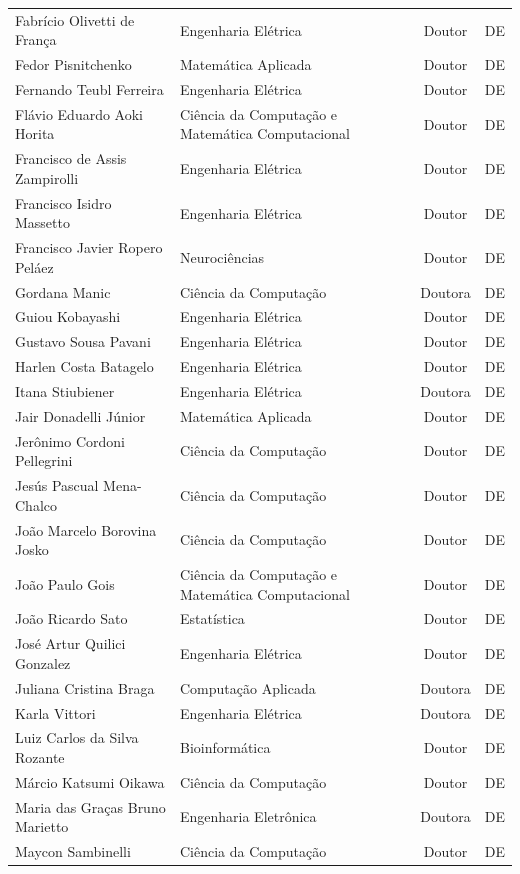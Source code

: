 \documentclass{article}
\begin{document}
\begin{longtable}{|l|l|c|c|}
Fabrício Olivetti de França & Engenharia Elétrica & Doutor & DE \\
Fedor Pisnitchenko & Matemática Aplicada & Doutor & DE \\
Fernando Teubl Ferreira & Engenharia Elétrica & Doutor & DE \\
Flávio Eduardo Aoki Horita & Ciência da Computação e Matemática Computacional & Doutor & DE \\
Francisco de Assis Zampirolli & Engenharia Elétrica & Doutor & DE \\
Francisco Isidro Massetto & Engenharia Elétrica & Doutor & DE \\
Francisco Javier Ropero Peláez & Neurociências & Doutor & DE \\
Gordana Manic & Ciência da Computação & Doutora & DE \\
Guiou Kobayashi & Engenharia Elétrica & Doutor & DE \\
Gustavo Sousa Pavani & Engenharia Elétrica & Doutor & DE \\
Harlen Costa Batagelo & Engenharia Elétrica & Doutor & DE \\
Itana Stiubiener & Engenharia Elétrica  & Doutora & DE \\
Jair Donadelli Júnior & Matemática Aplicada & Doutor & DE \\
Jerônimo Cordoni Pellegrini & Ciência da Computação & Doutor & DE \\
Jesús Pascual Mena-Chalco & Ciência da Computação & Doutor & DE \\
João Marcelo Borovina Josko & Ciência da Computação & Doutor & DE \\
João Paulo Gois & Ciência da Computação e Matemática Computacional & Doutor & DE \\
João Ricardo Sato & Estatística & Doutor & DE \\
José Artur Quilici Gonzalez & Engenharia Elétrica & Doutor & DE \\
Juliana Cristina Braga & Computação Aplicada & Doutora & DE \\
Karla Vittori & Engenharia Elétrica & Doutora & DE \\
Luiz Carlos da Silva Rozante & Bioinformática & Doutor & DE \\
Márcio Katsumi Oikawa & Ciência da Computação & Doutor & DE \\
Maria das Graças Bruno Marietto & Engenharia Eletrônica & Doutora & DE \\
Maycon Sambinelli &Ciência da Computação  & Doutor & DE \\

\end{longtable}
\end{document}
